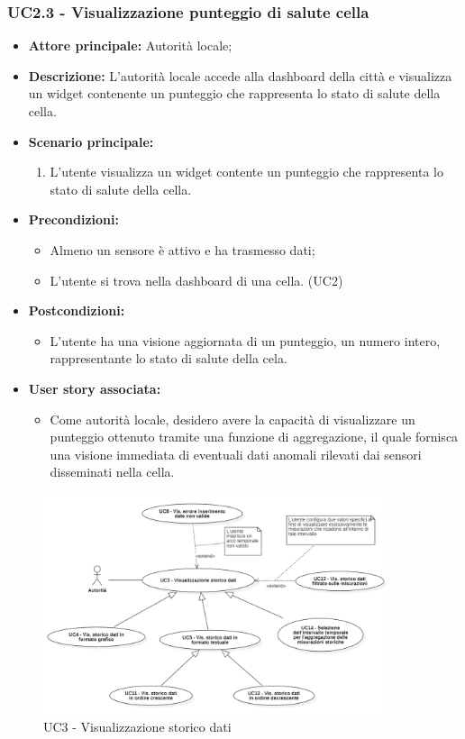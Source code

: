 \documentclass{article}
\begin{document}
\subsubsection{UC2.3 - Visualizzazione punteggio di salute cella}
\begin{itemize}
    \item \textbf{Attore principale:} Autorità locale;
    \item \textbf{Descrizione:} L'autorità locale accede alla dashboard della città e visualizza un widget contenente un punteggio che rappresenta lo stato di salute della cella.
    \item \textbf{Scenario principale:}
          \begin{enumerate}
              \item L'utente visualizza un widget contente un punteggio che rappresenta lo stato di salute della cella.
          \end{enumerate}
    \item \textbf{Precondizioni:}
          \begin{itemize}
              \item Almeno un sensore è attivo e ha trasmesso dati;
              \item L'utente si trova nella dashboard di una cella. (UC2)
          \end{itemize}
    \item \textbf{Postcondizioni:}
          \begin{itemize}
              \item      L'utente ha una visione aggiornata di un punteggio, un numero intero, rappresentante lo stato di salute della cela.
          \end{itemize}
    \item \textbf{User story associata:}
          \begin{itemize}
              \item Come autorità locale, desidero avere la capacità di visualizzare un punteggio ottenuto tramite una funzione di aggregazione, il quale fornisca una visione immediata di eventuali dati anomali rilevati dai sensori disseminati nella cella.
          \end{itemize}
\end{itemize}

\begin{figure}[H]
    \centering
    \includegraphics[width=0.9\textwidth]{Images/uc3.png}
    \caption{UC3 - Visualizzazione storico dati }
    \label{fig:UC3}
\end{figure}
\end{document}
